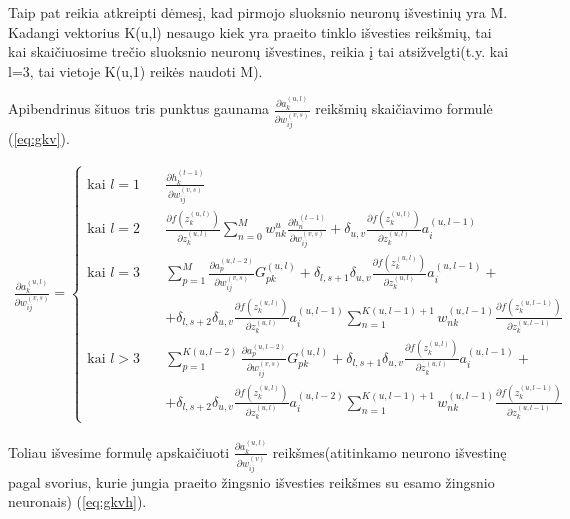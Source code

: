   Taip pat reikia atkreipti dėmesį, kad pirmojo sluoksnio neuronų išvestinių yra M. Kadangi vektorius K(u,l) nesaugo kiek yra praeito tinklo išvesties reikšmių, tai kai skaičiuosime trečio sluoksnio neuronų išvestines, reikia į tai atsižvelgti(t.y. kai l=3, tai vietoje K(u,1) reikės naudoti M).


Apibendrinus šituos tris punktus gaunama $\frac{\partial a_k^{(u,l)}}{\partial w_{ij}^{(v,s)}}$ reikšmių skaičiavimo formulė (\ref{eq:gkv}).


\begin{equation} \label{eq:gkv}
  \begin{aligned}
    \frac{\partial a_k^{(u,l)}}{\partial w_{ij}^{(v,s)}} = \left \{
    \begin{aligned}
      \text{kai } l=1 \quad& \frac{\partial h_k^{(t-1)}}{\partial w_{ij}^{(v,s)}}\\
      \text{kai } l=2 \quad& \frac{\partial f(z_k^{(u,l)})}{\partial z_k^{(u,l)}}
        \sum_{n=0}^M w_{nk}^u \frac{\partial h_n^{(t-1)}}{\partial w_{ij}^{(v,s)}} +
        \delta_{u,v}\frac{\partial f(z_k^{(u,l)})}{\partial z_k^{(u,l)}}a_i^{(u,l-1)}\\
      \text{kai } l=3 \quad& \sum_{p=1}^{M}
        \frac{\partial a_p^{(u,l-2)}}{\partial w_{ij}^{(v,s)}}G_{pk}^{(u,l)} +
        \delta_{l,s+1}\delta_{u,v}\frac{\partial f(z_k^{(u,l)})}{\partial z_k^{(u,l)}}a_i^{(u,l-1)} + \\
        & + \delta_{l,s+2}\delta_{u,v}\frac{\partial f(z_k^{(u,l)})}{\partial z_k^{(u,l)}}a_i^{(u,l-1)}\sum_{n=1}^{K(u,l-1)+1}
        w_{nk}^{(u,l-1)}\frac{\partial f(z_k^{(u,l-1)})}{\partial z_k^{(u,l-1)}}\\
      \text{kai } l>3 \quad& \sum_{p=1}^{K(u,l-2)}
        \frac{\partial a_p^{(u,l-2)}}{\partial w_{ij}^{(v,s)}}G_{pk}^{(u,l)} +
        \delta_{l,s+1}\delta_{u,v}\frac{\partial f(z_k^{(u,l)})}{\partial z_k^{(u,l)}}a_i^{(u,l-1)} + \\
        & + \delta_{l,s+2}\delta_{u,v}\frac{\partial f(z_k^{(u,l)})}{\partial z_k^{(u,l)}}a_i^{(u,l-2)}\sum_{n=1}^{K(u,l-1)+1}
        w_{nk}^{(u,l-1)}\frac{\partial f(z_k^{(u,l-1)})}{\partial z_k^{(u,l-1)}}
    \end{aligned}
    \right.
  \end{aligned}
\end{equation}

Toliau išvesime formulę apskaičiuoti $\frac{\partial a_k^{(u,l)}}{\partial w_{ij}^{(v)}}$ reikšmes(atitinkamo neurono išvestinę pagal svorius, kurie jungia praeito žingsnio išvesties reikšmes su esamo žingsnio neuronais) (\ref{eq:gkvh}).

